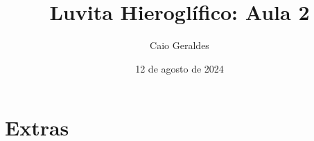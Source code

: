 \documentclass[article]{luvita}
\title{Luvita Hieroglífico: Aula 2}
\author{Caio Geraldes}
\date{12 de agosto de 2024}
\begin{document}
\frontmatter

\mainmatter%

\maketitle




\backmatter%

\printbibliography%

\clearpage

\chapter*{Extras}

\end{document}
